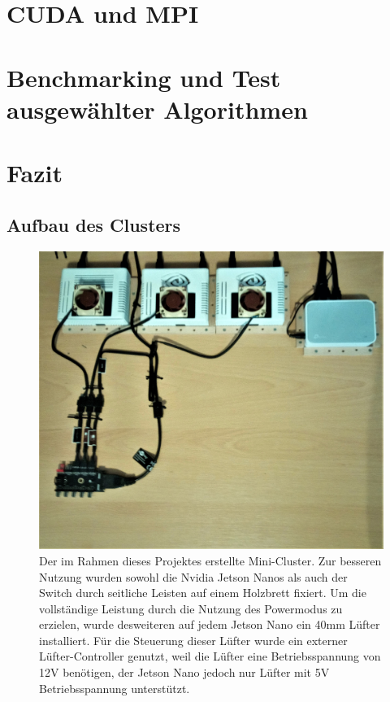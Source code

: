 \documentclass[doktyp=semarbeit, sprache=german]{TUBAFarbeiten}
\begin{document}
\section{CUDA und MPI}

\section{Benchmarking und Test ausgewählter Algorithmen}
\section{Fazit}
\newpage
{} 
\begin{appendix} 
\section{Aufbau des Clusters}
\begin{figure}
	\centering
	\includegraphics[width=1.0\textwidth]{images/Foto1.jpg}
	\caption{Der im Rahmen dieses Projektes erstellte Mini-Cluster. Zur besseren Nutzung wurden sowohl die Nvidia Jetson Nanos als auch der Switch durch seitliche Leisten auf einem Holzbrett fixiert. Um die vollständige Leistung durch die Nutzung des Powermodus zu erzielen, wurde desweiteren auf jedem Jetson Nano ein 40mm Lüfter installiert. Für die Steuerung dieser Lüfter wurde ein externer Lüfter-Controller genutzt, weil die Lüfter eine Betriebsspannung von 12V benötigen, der Jetson Nano jedoch nur Lüfter mit 5V Betriebsspannung unterstützt.}
	\label{img:foto1}
\end{figure}
\end{appendix}
\newpage
{}
\end{document}
